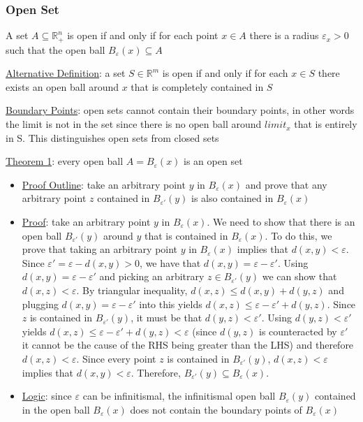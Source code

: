 \documentclass{article}
\begin{document}
\subsubsection{Open Set}
A set $A \subseteq \mathbb{R}_{+}^{n}$ is open if and only if for each point $x \in A$ there is a radius $\varepsilon_{x} > 0$ such that the open ball $B_{\varepsilon}(x) \subseteq A$ \par \vspace{0.3em}
  \underline{Alternative Definition}: a set $S \in \mathbb{R}^{m}$ is open if and only if for each $x \in S$ there exists an open ball around $x$ that is completely contained in $S$ \par
  \underline{Boundary Points}: open sets cannot contain their boundary points, in other words the limit is not in the set since there is no open ball around $limit_{x}$ that is entirely in S. This distinguishes open sets from closed sets \par
  \underline{Theorem 1}: every open ball $A = B_{\varepsilon}(x)$ is an open set
  \begin{itemize}
    \item  \underline{Proof Outline}: take an arbitrary point $y$ in $B_{\varepsilon}(x)$ and prove that any arbitrary point $z$ contained in $B_{\varepsilon'}(y)$ is also contained in $B_{\varepsilon}(x)$
    \item  \underline{Proof}: take an arbitrary point $y$ in $B_{\varepsilon}(x)$. We need to show that there is an open ball $B_{\varepsilon'}(y)$ around $y$ that is contained in $B_{\varepsilon}(x)$. To do this, we prove that taking an arbitrary point $y$ in $B_{\varepsilon}(x)$ implies that $d(x,y) < \varepsilon$. Since $\varepsilon' = \varepsilon - d(x,y) > 0$, we have that $d(x,y) = \varepsilon - \varepsilon'$. Using $d(x,y) = \varepsilon - \varepsilon'$ and picking an arbitrary $z \in B_{\varepsilon'}(y)$ we can show that $d(x,z) < \varepsilon$. By triangular inequality, $d(x,z) \leq d(x,y) + d(y,z)$ and plugging $d(x,y) = \varepsilon - \varepsilon'$ into this yields $d(x,z) \leq \varepsilon - \varepsilon' + d(y,z)$. Since $z$ is contained in $B_{\varepsilon'}(y)$, it must be that $d(y,z) < \varepsilon'$. Using $d(y,z) < \varepsilon'$ yields $d(x,z) \leq \varepsilon - \varepsilon' + d(y,z) < \varepsilon$ (since $d(y,z)$ is counteracted by $\varepsilon'$ it cannot be the cause of the RHS being greater than the LHS) and therefore $d(x,z) < \varepsilon$. Since every point $z$ is contained in $B_{\varepsilon'}(y)$, $d(x,z) < \varepsilon$ implies that $d(x,y) < \varepsilon$. Therefore, $B_{\varepsilon'}(y) \subseteq B_{\varepsilon}(x)$.
    \item  \underline{Logic}: since $\varepsilon$ can be infinitismal, the infinitismal open ball $B_{\varepsilon}(y)$ contained in the open ball $B_{\varepsilon}(x)$ does not contain the boundary points of $B_{\varepsilon}(x)$
  \end{itemize}
\end{document}
